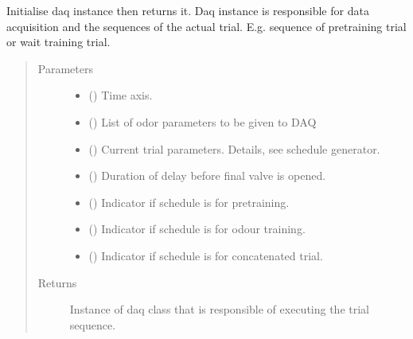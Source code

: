 \documentclass[letterpaper,10pt,english]{sphinxmanual}
\begin{document}
\begin{fulllineitems}
\begin{fulllineitems}
\pysigstopsignatures
\sphinxAtStartPar
Initialise daq instance then returns it. Daq instance is responsible
for data acquisition and the sequences of the actual trial. E.g.
sequence of pretraining trial or wait training trial.
\begin{quote}\begin{description}
\item[{Parameters}] \leavevmode\begin{itemize}
\item {} 
\sphinxAtStartPar
{} () \textendash{} Time axis.

\item {} 
\sphinxAtStartPar
{} () \textendash{} List of odor parameters to be given to DAQ

\item {} 
\sphinxAtStartPar
{} () \textendash{} Current trial parameters. Details, see schedule generator.

\item {} 
\sphinxAtStartPar
{} () \textendash{} Duration of delay before final valve is opened.

\item {} 
\sphinxAtStartPar
{} () \textendash{} Indicator if schedule is for pretraining.

\item {} 
\sphinxAtStartPar
{} () \textendash{} Indicator if schedule is for odour training.

\item {} 
\sphinxAtStartPar
{} () \textendash{} Indicator if schedule is for concatenated trial.

\end{itemize}

\item[{Returns}] \leavevmode
\sphinxAtStartPar
{} \textendash{} Instance of daq class that is responsible of executing the trial
sequence.


\end{description}
\end{quote}
\end{fulllineitems}
\end{fulllineitems}
\end{document}
